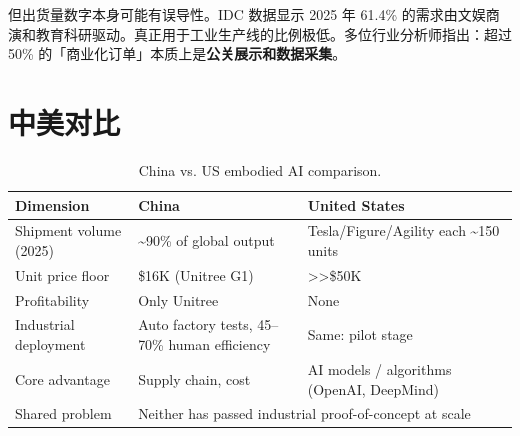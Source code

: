 但出货量数字本身可能有误导性。IDC 数据显示 2025 年 61.4\% 的需求由文娱商演和教育科研驱动\cite{idc2025humanoid}。真正用于工业生产线的比例极低。多位行业分析师指出：超过 50\% 的「商业化订单」本质上是\textbf{公关展示和数据采集}。

\section{中美对比}

\begin{table}[htbp]
\centering
\caption{China vs. US embodied AI comparison.}
\label{tab:cnvsus}
\begin{tabularx}{\textwidth}{lXX}
\toprule
\rowcolor{figLightGray}
\textbf{Dimension} & \textbf{China} & \textbf{United States} \\
\midrule
Shipment volume (2025) & \textasciitilde90\% of global output & Tesla/Figure/Agility each \textasciitilde150 units \\
Unit price floor & \$16K (Unitree G1) & >>\$50K \\
Profitability & Only Unitree & None \\
Industrial deployment & Auto factory tests, 45--70\% human efficiency & Same: pilot stage \\
Core advantage & Supply chain, cost & AI models / algorithms (OpenAI, DeepMind) \\
Shared problem & \multicolumn{2}{l}{Neither has passed industrial proof-of-concept at scale} \\
\bottomrule
\end{tabularx}
\end{table}
